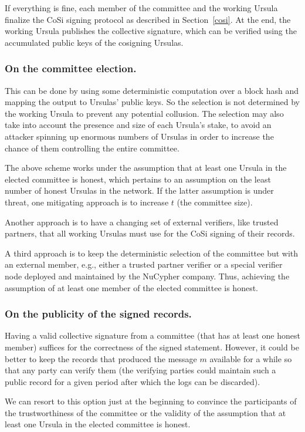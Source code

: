 If everything is fine, each member of the committee and the working 
Ursula finalize the CoSi signing protocol as described in Section~\ref{cosi}. 
At the end, the working Ursula publishes the collective signature, which can be 
verified using the accumulated public keys of the cosigning Ursulas.


\subsubsection{On the committee election.} This can be done
by using some deterministic computation over a block hash and mapping
the output to Ursulas' public keys. So the selection is not determined by the
working Ursula to prevent any potential collusion. The selection may also take into account the presence and size of each Ursula's stake, to avoid an attacker spinning up enormous numbers of Ursulas in order to increase the chance of them controlling the entire committee.


The above scheme works under the assumption that at least one Ursula
in the elected committee is honest, which pertains to an assumption on the
least number of honest Ursulas in the network. If the latter assumption is under threat, one mitigating approach is to increase $t$ (the committee size).


Another approach is to have a changing set of external verifiers, like
trusted partners, that all working Ursulas must use for the CoSi signing
of their records.


A third approach is to keep the deterministic selection of the committee
but with an external member, e.g., either a trusted partner verifier
or a special verifier node deployed and maintained by the NuCypher company.
Thus, achieving the assumption of at least one member of the elected
committee is honest.


\subsubsection{On the publicity of the signed records.} Having a 
valid collective signature from a committee (that has at least one honest 
member) suffices for the correctness of the signed statement. However, 
it could be better to keep the records that produced the message $m$  
available for a while so that any party can verify them (the verifying
parties could maintain such a public record for a given period after which
the logs can be discarded). 


We can resort to this option just at the beginning to convince the 
participants of the trustworthiness of the committee or the validity of the
assumption that at least one Ursula in the elected committee is honest.


